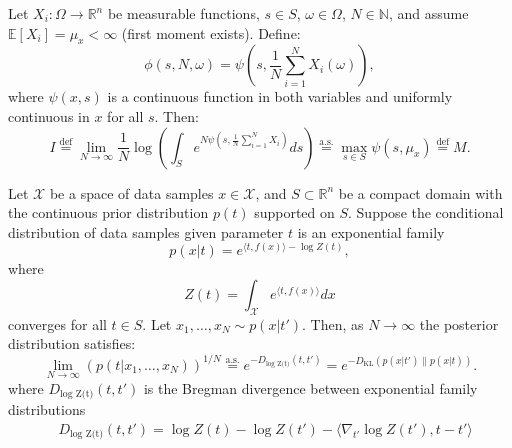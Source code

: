 \documentclass[10pt,a4paper]{amsart}
\begin{document}
\begin{lemma}\label{Lemma:Integral}
Let $X_i: \Omega \to \mathbb{R}^n$ be measurable functions, $s \in S$, $\omega \in \Omega$, $N \in \mathbb{N}$, and assume $\mathbb{E}[X_i] = \mu_x < \infty$ (first moment exists). Define:
\begin{equation}
\phi(s, N, \omega) = \psi\left(s, \frac{1}{N} \sum_{i=1}^N X_i(\omega)\right),
\end{equation}
where $\psi(x,s)$ is a continuous function in both variables and uniformly continuous in $x$ for all $s$.
Then:
\begin{equation}
I \overset{\text{def}}{=} \lim_{N \to \infty} \frac{1}{N} \log \left( \int_S e^{N \psi(s, \frac{1}{N} \sum_{i=1}^N X_i)} ds \right) \overset{\text{a.s.}}{=} \max_{s \in S} \psi(s, \mu_x) \overset{\text{def}}{=} M.
\end{equation}
\end{lemma}

\begin{theorem}
Let $ \mathcal{X} $ be a space of data samples $ x \in \mathcal{X} $, and $ S \subset \mathbb{R}^n $ be a compact domain with the continuous prior distribution $p(t)$ supported on $S$.
Suppose the conditional distribution of data samples given parameter $t$ is an exponential family
\begin{equation}
p(x|t) = e^{\langle t, f(x) \rangle - \log Z(t)},
\end{equation}
where 
\begin{equation}
Z(t) = \int_{\mathcal{X}} e^{\langle t, f(x) \rangle} dx
\end{equation}
converges for all $ t \in S $. Let $ x_1, \ldots, x_N \sim p(x|t') $. Then, as $N\to\infty$ the posterior distribution satisfies:
\begin{equation}
 \lim_{N \to \infty} \left(p(t|x_1, \ldots, x_N)\right)^{1/N} \overset{\text{a.s.}}{=} e^{-D_\text{log Z(t)}(t, t')} = e^{-D_\text{KL}(p(x|t') \| p(x|t))}.
\end{equation}
where $D_\text{log Z(t)}(t, t')$ is the Bregman divergence between exponential family distributions
\begin{equation}
    \begin{split}
        &D_\text{log Z(t)}(t, t') = \log Z(t) - \log Z(t') - \langle \nabla_{t'} \log Z(t'), t - t'  \rangle
    \end{split}
\end{equation}
\end{theorem}
\end{document}

